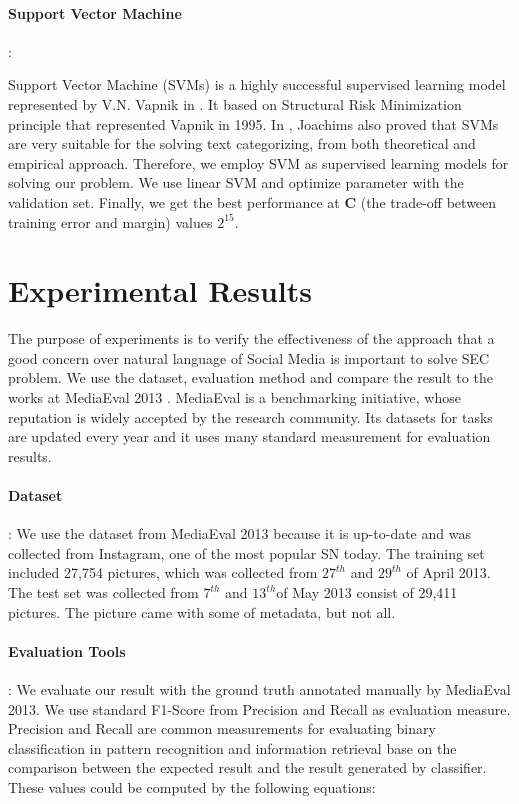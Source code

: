 \documentclass{llncs}
\begin{document}
\paragraph{Support Vector Machine}:

Support Vector Machine (SVMs) is a highly successful supervised learning model represented by V.N. Vapnik in  \cite{vapnik2000nature} \cite{vapnik1998statistical}. It based on Structural Risk Minimization principle that represented Vapnik in 1995. In \cite{joachims2001statistical}, Joachims also proved that SVMs are very suitable for the solving text categorizing, from both theoretical and empirical approach. Therefore, we employ SVM as supervised learning models for solving our problem. We use linear SVM and optimize parameter with the validation set. Finally, we get the best performance at \textbf{C} (the trade-off between training error and margin) values $2^{15}$.

\section{Experimental Results}
\label{result}

The purpose of experiments is to verify the effectiveness of the approach that a good concern over natural language of Social Media is important to solve SEC problem. We use the dataset, evaluation method and compare the result to the works at MediaEval 2013 \cite{reuter2013social}. MediaEval is a benchmarking initiative, whose reputation is widely accepted by the research community. Its datasets for tasks are updated every year and it uses many standard measurement for evaluation results.

\paragraph{Dataset}: We use the dataset from MediaEval 2013 because it is up-to-date and was collected from Instagram, one of the most popular SN today. The training set included 27,754 pictures, which was collected from $27^{th}$ and $29^{th}$ of April 2013. The test set was collected from $7^{th}$ and $13^{th} $of May 2013 consist of 29,411 pictures. The picture came with some of metadata, but not all. 

\paragraph{Evaluation Tools}: We evaluate our result with the ground truth  annotated manually by MediaEval 2013. We use standard F1-Score from Precision and Recall as evaluation measure. Precision and Recall are common measurements for evaluating binary classification in pattern recognition and information retrieval base on the comparison between the expected result and the result generated by classifier. These values could be computed by the following equations:  
\end{document}
